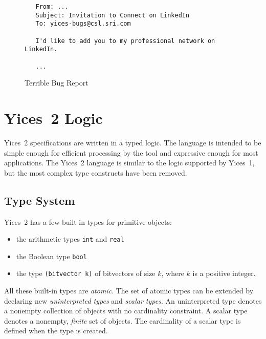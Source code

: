 \documentclass[11pt,twoside,fleqn,openright,titlepage]{cslreport}
\begin{document}
\begin{figure}
\begin{center}
\begin{footnotesize}
\begin{verbatim}
   From: ...
   Subject: Invitation to Connect on LinkedIn
   To: yices-bugs@csl.sri.com

   I'd like to add you to my professional network on LinkedIn.

   ...
\end{verbatim}
\end{footnotesize}
\end{center}
\caption{Terrible Bug Report}
\label{terrible-report}
\end{figure}



\chapter{Yices~2 Logic}
\label{language}

Yices~2 specifications are  written in a typed logic.  The language is
intended to be simple enough  for efficient processing by the tool and
expressive  enough  for most  applications.  The  Yices~2 language  is
similar to the  logic supported by Yices~1, but  the most complex type
constructs have been removed.


\section{Type System}
\label{type-system}

Yices~2 has a few built-in types for primitive objects:
\begin{itemize}
\item the arithmetic types \texttt{int} and \texttt{real}
\item the Boolean type \texttt{bool}
\item the type \texttt{(bitvector k)} of bitvectors of size $k$,
 where $k$ is a positive integer.
\end{itemize}
All these built-in  types are {\em atomic\/}. The  set of atomic types
can be extended by declaring  new {\em uninterpreted types\/} and {\em
  scalar types\/}. An uninterpreted type denotes a nonempty collection
of objects  with no  cardinality constraint. A  scalar type  denotes a
nonempty, {\em finite\/}  set of objects. The cardinality  of a scalar
type is defined when the type is created.
\end{document}
